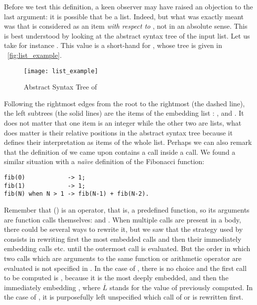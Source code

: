 \noindent Before we test this definition, a keen observer may have
raised an objection to the last argument: it is possible that
 be a list. Indeed, but what was exactly meant was that
 is considered as an item \emph{with respect to
  }, not in an absolute sense. This is best
understood by looking at the abstract syntax tree of the input
list. Let us take for instance . This value is
a short\hyp{}hand for , whose tree
is given in \fig~\vref{fig:list_example}.
\begin{figure}
\centering
\texttt{[image: list\_example]}%
\caption{Abstract Syntax Tree of 
\label{fig:list_example}}
\end{figure}
Following the rightmost edges from the root to the rightmost
\erlcode{[]} (the dashed line), the left subtrees (the solid
lines) are the items of the embedding list :
, \erlcode{[1,[]]} and \erlcode{[]}. It does not matter
that one item is an integer while the other two are lists, what does
matter is their relative positions in the abstract syntax tree because
it defines their interpretation as items of the whole list. Perhaps we
can also remark that the definition of  we came upon
contains a call inside a call. We found  a similar
situation with a \emph{na\"{\i}ve} definition of the Fibonacci
function:
\begin{verbatim}
fib(0)            -> 1;
fib(1)            -> 1;
fib(N) when N > 1 -> fib(N-1) + fib(N-2).
\end{verbatim}
Remember that (\erlcode{+}) is an operator, that is, a predefined
function, so its arguments are function calls themselves:
 and . When multiple calls are
present in a body, there could be several ways to rewrite it, but we
saw that the strategy used by \Erlang consists in rewriting first the
most embedded calls and then their immediately embedding calls
etc. until the outermost call is evaluated. But the order in which two
calls which are arguments to the same function or arithmetic operator
are evaluated is not specified in \Erlang. In the case of
, there is no choice and the first call to be computed
is , because it is the most deeply embedded, and
then the immediately embedding
, where \(\overline{L}\)
stands for the value of  previously computed. In
the case of , it is purposefully left unspecified which
call of  or  is rewritten first.

